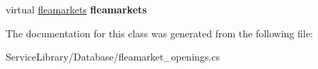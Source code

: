 \begin{DoxyCompactItemize}
\item 
\hypertarget{class_service_library_1_1_database_1_1fleamarket__openings_ad8631cd16f192583e3381d8deb7bed35}{virtual \hyperlink{class_service_library_1_1_database_1_1fleamarkets}{fleamarkets} {\bfseries fleamarkets}}\label{class_service_library_1_1_database_1_1fleamarket__openings_ad8631cd16f192583e3381d8deb7bed35}

\end{DoxyCompactItemize}


The documentation for this class was generated from the following file\-:\begin{DoxyCompactItemize}
\item 
Service\-Library/\-Database/fleamarket\-\_\-openings.\-cs\end{DoxyCompactItemize}
